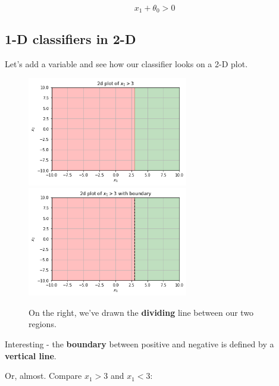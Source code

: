         \begin{equation}
            x_1 + \theta_0 > 0
        \end{equation}
    
    \subsection*{1-D classifiers in 2-D}
        
        Let's add a variable and see how our classifier looks on a 2-D plot.
        
        \begin{figure}[H]
                \includegraphics[width=70mm,scale=0.5]{images/classification_images/x1_2d_plot.png}
                \includegraphics[width=70mm,scale=0.5]{images/classification_images/x1_2d_plot_boundary.png}
                
                \caption*{On the right, we've drawn the \textbf{dividing} line between our two regions.}
        \end{figure}
        
        Interesting - the \textbf{boundary} between positive and negative is defined by a \textbf{vertical line}.
        
        Or, almost. Compare $x_1>3$ and $x_1<3$:
        
